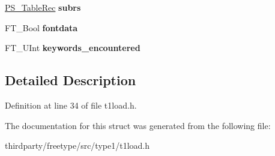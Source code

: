 \begin{DoxyCompactItemize}
\item 
\mbox{\label{struct_t1___loader___a937ecec2799afd369e87eed5f0aec05c}} 
\hyperlink{struct_p_s___table_rec__}{P\+S\+\_\+\+Table\+Rec} {\bfseries subrs}
\item 
\mbox{\label{struct_t1___loader___a27294f1f95b9f43911860d9d613ac047}} 
F\+T\+\_\+\+Bool {\bfseries fontdata}
\item 
\mbox{\label{struct_t1___loader___acccf00a901400e98ad8d24ed461c68b3}} 
F\+T\+\_\+\+U\+Int {\bfseries keywords\+\_\+encountered}
\end{DoxyCompactItemize}


\subsection{Detailed Description}


Definition at line 34 of file t1load.\+h.



The documentation for this struct was generated from the following file\+:\begin{DoxyCompactItemize}
\item 
thirdparty/freetype/src/type1/t1load.\+h\end{DoxyCompactItemize}
